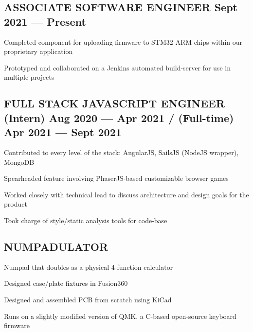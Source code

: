 \documentclass[letter,10pt]{article}
\begin{document}
\subsection{{ASSOCIATE SOFTWARE ENGINEER \texorpdfstring{\hfill}{\space} Sept 2021 --- Present}}
\begin{zitemize}
\item Completed component for uploading firmware to STM32 ARM chips within our proprietary application
\item Prototyped and collaborated on a Jenkins automated build-server for use in multiple projects
\end{zitemize}

\subsection{{FULL STACK JAVASCRIPT ENGINEER \texorpdfstring{\hfill}{\space} (Intern) Aug 2020 --- Apr 2021 / (Full-time) Apr 2021 --- Sept 2021}}
\begin{zitemize}
\item Contributed to every level of the stack: AngularJS, SailsJS (NodeJS wrapper), MongoDB
\item Spearheaded feature involving PhaserJS-based customizable browser games
\item Worked closely with technical lead to discuss architecture and design goals for the product
\item Took charge of style/static analysis tools for code-base
\end{zitemize}

\subsection{{NUMPADULATOR}}
\begin{zitemize}
\item Numpad that doubles as a physical 4-function calculator
\item Designed case/plate fixtures in Fusion360
\item Designed and assembled PCB from scratch using KiCad
\item Runs on a slightly modified version of QMK, a C-based open-source keyboard firmware
\end{zitemize}
\end{document}
